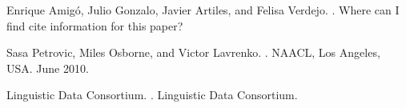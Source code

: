 \documentclass[11pt]{article}
\begin{document}
\begin{thebibliography}{}

Enrique Amig\'{o}, Julio Gonzalo, Javier Artiles, and Felisa Verdejo.
.
\newblock Where can I find cite information for this paper?

Sasa Petrovic, Miles Osborne, and Victor Lavrenko.
.
\newblock NAACL, Los Angeles, USA. June 2010.

{Linguistic Data Consortium}.
.
\newblock Linguistic Data Consortium.

\end{thebibliography}
\end{document}

